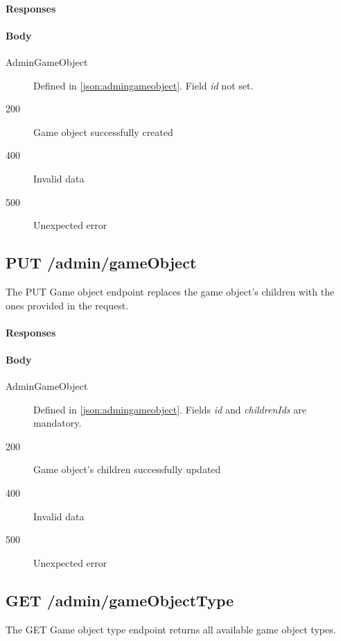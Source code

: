 		\paragraph*{Responses}
			\paragraph*{Body}
				\begin{description}
					\item[AdminGameObject] Defined in \ref{json:admingameobject}. Field \textit{id} not set.
				\end{description}
			\begin{description}		
				\item[200] Game object successfully created
				\item[400] Invalid data
				\item[500] Unexpected error
			\end{description}
			
	\subsection{PUT /admin/gameObject}
	The PUT Game object endpoint replaces the game object's children with the ones provided in the request.
		\paragraph*{Responses}
			\paragraph*{Body}
				\begin{description}
					\item[AdminGameObject] Defined in \ref{json:admingameobject}. Fields \textit{id} and \textit{childrenIds} are mandatory.
				\end{description}
			\begin{description}		
				\item[200] Game object's children successfully updated
				\item[400] Invalid data
				\item[500] Unexpected error
			\end{description}
			
	\subsection{GET /admin/gameObjectType}
	The GET Game object type endpoint returns all available game object types.
